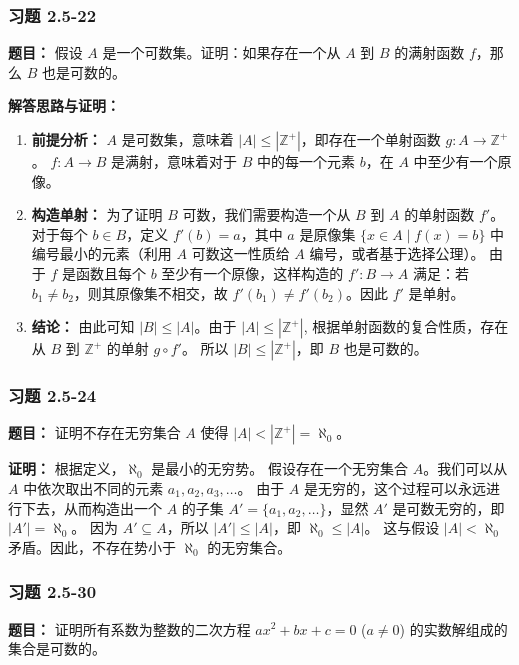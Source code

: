 \documentclass[11pt,UTF8]{article}
\begin{document}
\subsubsection*{习题 2.5-22}
\textbf{题目：} 假设 $A$ 是一个可数集。证明：如果存在一个从 $A$ 到 $B$ 的满射函数 $f$，那么 $B$ 也是可数的。

\textbf{解答思路与证明：}
\begin{enumerate}[1.]
    \item \textbf{前提分析：} 
    $A$ 是可数集，意味着 $|A| \le |\mathbb{Z}^+|$，即存在一个单射函数 $g: A \to \mathbb{Z}^+$。
    $f: A \to B$ 是满射，意味着对于 $B$ 中的每一个元素 $b$，在 $A$ 中至少有一个原像。

    \item \textbf{构造单射：} 
    为了证明 $B$ 可数，我们需要构造一个从 $B$ 到 $A$ 的单射函数 $f'$。
    对于每个 $b \in B$，定义 $f'(b) = a$，其中 $a$ 是原像集 $\{x \in A \mid f(x) = b\}$ 中编号最小的元素（利用 $A$ 可数这一性质给 $A$ 编号，或者基于选择公理）。
    由于 $f$ 是函数且每个 $b$ 至少有一个原像，这样构造的 $f': B \to A$ 满足：若 $b_1 \neq b_2$，则其原像集不相交，故 $f'(b_1) \neq f'(b_2)$。因此 $f'$ 是单射。

    \item \textbf{结论：} 
    由此可知 $|B| \le |A|$。由于 $|A| \le |\mathbb{Z}^+|$, 根据单射函数的复合性质，存在从 $B$ 到 $\mathbb{Z}^+$ 的单射 $g \circ f'$。
    所以 $|B| \le |\mathbb{Z}^+|$，即 $B$ 也是可数的。
\end{enumerate}

\subsubsection*{习题 2.5-24}
\textbf{题目：} 证明不存在无穷集合 $A$ 使得 $|A| < |\mathbb{Z}^+| = \aleph_0$。

\textbf{证明：}
根据定义，$\aleph_0$ 是最小的无穷势。
假设存在一个无穷集合 $A$。我们可以从 $A$ 中依次取出不同的元素 $a_1, a_2, a_3, \dots$。
由于 $A$ 是无穷的，这个过程可以永远进行下去，从而构造出一个 $A$ 的子集 $A' = \{a_1, a_2, \dots\}$，显然 $A'$ 是可数无穷的，即 $|A'| = \aleph_0$。
因为 $A' \subseteq A$，所以 $|A'| \le |A|$，即 $\aleph_0 \le |A|$。
这与假设 $|A| < \aleph_0$ 矛盾。因此，不存在势小于 $\aleph_0$ 的无穷集合。

\subsubsection*{习题 2.5-30}
\textbf{题目：} 证明所有系数为整数的二次方程 $ax^2 + bx + c = 0$ ($a \neq 0$) 的实数解组成的集合是可数的。
\end{document}
